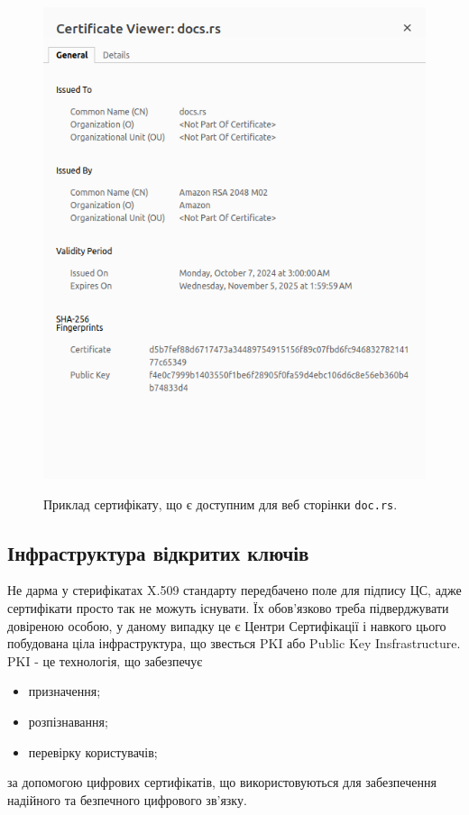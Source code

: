 \begin{figure}[ht]
        \centering
        \includegraphics[scale=0.35]{../IMAGES/certificate_example.png}
        \label{certificate_example}
        \caption{Приклад сертифікату, що є доступним для веб сторінки \texttt{doc.rs}.}
\end{figure}

\subsection{Інфраструктура відкритих ключів}

 Не дарма у стерифікатах X.509 стандарту передбачено поле для підпису ЦС, адже сертифікати просто так не можуть існувати. Їх обов'язково треба підверджувати довіреною особою, у даному випадку це є Центри Сертифікації і навкого цього побудована ціла інфраструктура, що звесться PKI або Public Key Insfrastructure. PKI - це технологія, що забезпечує 
 \begin{itemize}
     \item призначення;
     \item розпізнавання;
     \item перевірку користувачів;
 \end{itemize} 
 за допомогою цифрових сертифікатів, що використовуються для забезпечення надійного та безпечного цифрового зв'язку.

